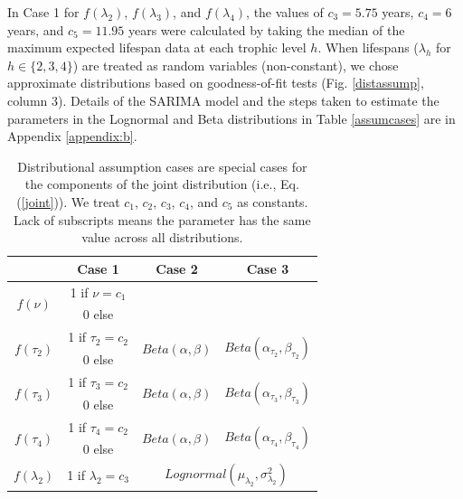 \documentclass[oneside,12pt,final]{sty/ucthesis-CA2012}
\let\cite\citep                             %
\begin{document}
\begin{mainmatter}
\vspace{5mm}

In Case 1 for $f(\lambda_2)$, $f(\lambda_3)$, and $f(\lambda_4)$, the values of $c_3=5.75$ years, $c_4=6$ years, and $c_5=11.95$ years were calculated by taking the median of the maximum expected lifespan data at each trophic level $h$. When lifespans ($\lambda_h$ for $h \in \{2, 3, 4\}$) are treated as random variables (non-constant), we chose approximate distributions based on goodness-of-fit tests \cite{fitdistrplus} (Fig. \ref{distassump}, column 3). Details of the SARIMA model and the steps taken to estimate the parameters in the Lognormal and Beta distributions in Table \ref{assumcases} are in Appendix \ref{appendix:b}.
   
\begin{table}[H]
\centering
\caption{Distributional assumption cases are special cases for the components of the joint distribution (i.e., Eq. (\ref{joint})). We treat $c_1$, $c_2$, $c_3$, $c_4$, and $c_5$ as constants.  Lack of subscripts means the parameter has the same value across all distributions.}
\begin{tabular}{|c|c|c|c|}
  \hline 
 	& Case 1 & Case 2 & Case 3  \\ 
   \hline
   \multirow{2}{*}{$f(\nu)$} 	& 1 if $\nu = c_1$ & 
   \multicolumn{2}{c|}{ \multirow{2}{*}{$Lognormal(\mu_\nu, \sigma_\nu^2)$ }} \\
   				& 0 else 			 & 	\multicolumn{2}{c|}{ } \\
   \hline   
   \multirow{2}{*}{$f(\tau_2)$} & 1 if $\tau_2 = c_2$ & \multirow{2}{*}{$Beta(\alpha, \beta)$} & \multirow{2}{*}{$Beta(\alpha_{\tau_2}, \beta_{\tau_2})$}  \\
         			& 0 else &  &  \\
   \hline   
   \multirow{2}{*}{$f(\tau_3)$}  & 1 if $\tau_3 = c_2$ & \multirow{2}{*}{$Beta(\alpha, \beta)$} & \multirow{2}{*}{$Beta(\alpha_{\tau_3}, \beta_{\tau_3})$}  \\
            			& 0 else & &  \\
   \hline  
   \multirow{2}{*}{$f(\tau_4)$} & 1 if $\tau_4 = c_2$ &  \multirow{2}{*}{$Beta(\alpha, \beta)$} & \multirow{2}{*}{$Beta(\alpha_{\tau_4}, \beta_{\tau_4})$}  \\
               			& 0 else & &  \\
   \hline      	
    \multirow{2}{*}{$f(\lambda_2)$} & 1 if $\lambda_2 = c_3$ & \multicolumn{2}{c|}{\multirow{2}{*}{$Lognormal(\mu_{\lambda_2}, \sigma_{\lambda_2}^2)$}} \\

\end{tabular}
\end{table}
\end{mainmatter}
\end{document}

